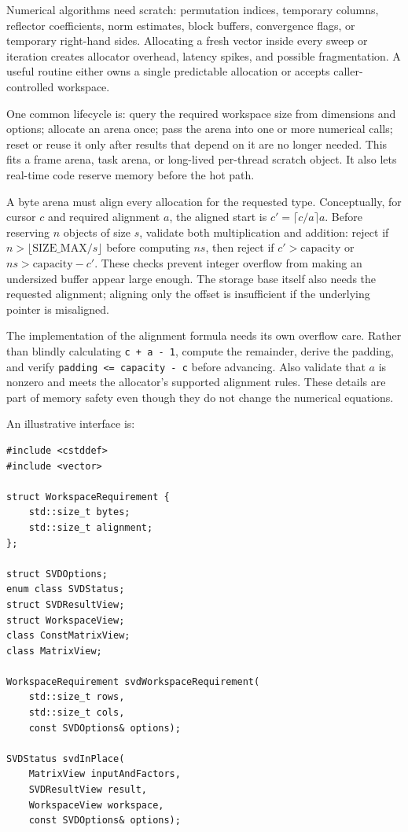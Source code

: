 Numerical algorithms need scratch: permutation indices, temporary columns, reflector coefficients, norm estimates, block buffers, convergence flags, or temporary right-hand sides. Allocating a fresh vector inside every sweep or iteration creates allocator overhead, latency spikes, and possible fragmentation. A useful routine either owns a single predictable allocation or accepts caller-controlled workspace.

One common lifecycle is: query the required workspace size from dimensions and options; allocate an arena once; pass the arena into one or more numerical calls; reset or reuse it only after results that depend on it are no longer needed. This fits a frame arena, task arena, or long-lived per-thread scratch object. It also lets real-time code reserve memory before the hot path.

A byte arena must align every allocation for the requested type. Conceptually, for cursor \(c\) and required alignment \(a\), the aligned start is \(c'=\lceil c/a\rceil a\). Before reserving \(n\) objects of size \(s\), validate both multiplication and addition: reject if \(n>\lfloor\text{SIZE\_MAX}/s\rfloor\) before computing \(ns\), then reject if \(c'>\text{capacity}\) or \(ns>\text{capacity}-c'\). These checks prevent integer overflow from making an undersized buffer appear large enough. The storage base itself also needs the requested alignment; aligning only the offset is insufficient if the underlying pointer is misaligned.

The implementation of the alignment formula needs its own overflow care. Rather than blindly calculating \texttt{c\ +\ a\ -\ 1}, compute the remainder, derive the padding, and verify \texttt{padding\ \textless{}=\ capacity\ -\ c} before advancing. Also validate that \(a\) is nonzero and meets the allocator's supported alignment rules. These details are part of memory safety even though they do not change the numerical equations.

An illustrative interface is:

\begin{verbatim}
#include <cstddef>
#include <vector>

struct WorkspaceRequirement {
    std::size_t bytes;
    std::size_t alignment;
};

struct SVDOptions;
enum class SVDStatus;
struct SVDResultView;
struct WorkspaceView;
class ConstMatrixView;
class MatrixView;

WorkspaceRequirement svdWorkspaceRequirement(
    std::size_t rows,
    std::size_t cols,
    const SVDOptions& options);

SVDStatus svdInPlace(
    MatrixView inputAndFactors,
    SVDResultView result,
    WorkspaceView workspace,
    const SVDOptions& options);
\end{verbatim}

